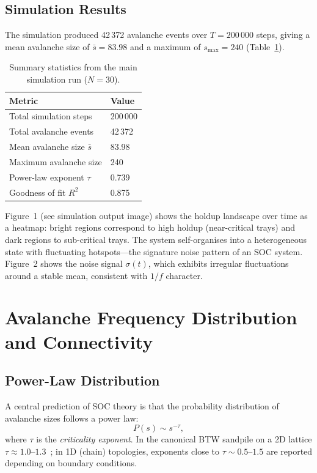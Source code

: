 \documentclass[twocolumn,12pt]{article}
\begin{document}
\subsection{Simulation Results}

The simulation produced 42\,372 avalanche events over $T = 200\,000$ steps,
giving a mean avalanche size of $\bar{s} = 83.98$ and a maximum of
$s_{\max} = 240$ (Table~\ref{tab:results}).

\begin{table}[H]
  \centering
  \caption{Summary statistics from the main simulation run ($N=30$).}
  \label{tab:results}
  \begin{tabular}{ll}
    \toprule
    Metric & Value \\
    \midrule
    Total simulation steps        & 200\,000   \\
    Total avalanche events        & 42\,372    \\
    Mean avalanche size $\bar{s}$ & 83.98      \\
    Maximum avalanche size        & 240        \\
    Power-law exponent $\tau$     & 0.739      \\
    Goodness of fit $R^{2}$       & 0.875      \\
    \bottomrule
  \end{tabular}
\end{table}

Figure~1 (see simulation output image) shows the holdup landscape over
time as a heatmap: bright regions correspond to high holdup (near-critical
trays) and dark regions to sub-critical trays.  The system self-organises
into a heterogeneous state with fluctuating hotspots---the signature
noise pattern of an SOC system.  Figure~2 shows the noise signal
$\sigma(t)$, which exhibits irregular fluctuations around a stable mean,
consistent with $1/f$ character.

\section{Avalanche Frequency Distribution and Connectivity}

\subsection{Power-Law Distribution}

A central prediction of SOC theory is that the probability distribution
of avalanche sizes follows a power law:
\begin{equation}
  P(s) \sim s^{-\tau},
  \label{eq:powerlaw}
\end{equation}
where $\tau$ is the \textit{criticality exponent}.  In the canonical BTW
sandpile on a 2D lattice $\tau \approx 1.0$--$1.3$~\cite{Pruessner2012}; in
1D (chain) topologies, exponents close to $\tau \sim 0.5$--$1.5$ are reported
depending on boundary conditions.
\end{document}

